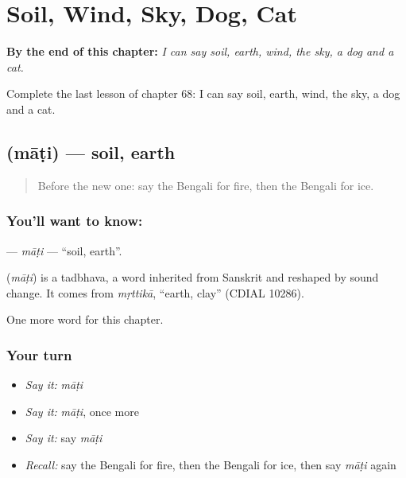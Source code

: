 
\chapter{Soil, Wind, Sky, Dog, Cat}
\label{ch:bn-soil-wind-sky-dog-cat}

\begin{chapteropening}
\textbf{By the end of this chapter:} \emph{I can say soil, earth, wind, the sky, a dog and a cat.}

Complete the last lesson of chapter 68: I can say soil, earth, wind, the sky, a dog and a cat.
\end{chapteropening}

\section[\texorpdfstring{\bn{মাটি} (māṭi)}{মাটি (māṭi)}]{ (māṭi) — soil, earth}

\label{lesson:BN-C68-mati}



\begin{quote}
Before the new one: say the Bengali for fire, then the Bengali for ice.
\end{quote}

\subsection*{You'll want to know: }
\textbf{} — \emph{māṭi} — \textquotedblleft{}soil, earth\textquotedblright{}.

\begin{cousinweb}
\textbf{} (\emph{māṭi}) is a tadbhava, a word inherited from Sanskrit and reshaped by sound change. It comes from \emph{mṛttikā}, \textquotedblleft{}earth, clay\textquotedblright{} (CDIAL 10286).
\end{cousinweb}

\begin{grammarlens}[title={What you've built}]
One more word for this chapter.
\end{grammarlens}

\subsection*{Your turn}
\begin{itemize}
\raggedright
  \item \emph{Say it:} \emph{māṭi}
  \item \emph{Say it:} \emph{māṭi}, once more
  \item \emph{Say it:} say \emph{māṭi}
  \item \emph{Recall:} say the Bengali for fire, then the Bengali for ice, then say \emph{māṭi} again
\end{itemize}

